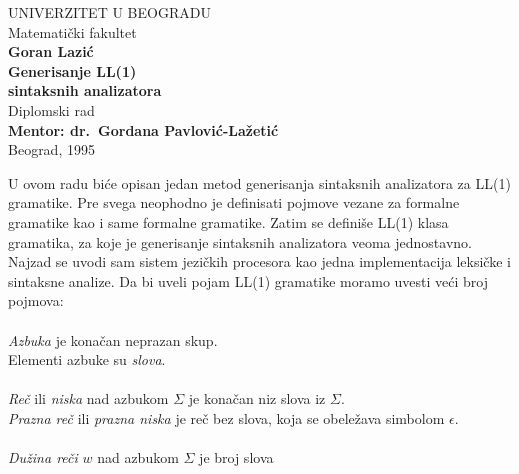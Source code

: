 %
%
  \begin{titlepage}
    \vspace{10em}
    \begin{center}
      {\Large UNIVERZITET U BEOGRADU}\\
      \vspace{1cm}
      {\Large Matemati\v cki fakultet}\\
      \vspace{4.5cm}
      {\Large{\bf Goran Lazi\'c}}\\
      \vspace{1cm}
      {\LARGE{\bf Generisanje LL(1)}}\\
      {\LARGE{\bf sintaksnih analizatora}}\\
      \vspace{0.7cm}
      {\Large Diplomski rad}\\
      \vspace{2cm}
      {\Large{\bf Mentor: dr.\ Gordana Pavlovi\'c-La\v zeti\'c}}\\
      \vspace{6.5cm}
      {\large Beograd, 1995}
    \end{center}
  \end{titlepage}
%
%
  \tableofcontents
%
%
  \noindent
    U ovom radu bi\'ce opisan jedan metod generisanja sintaksnih analizatora
    za LL(1) gramatike.
    Pre svega neophodno je definisati pojmove vezane za formalne gramatike
    kao i same formalne gramatike.
    Zatim se defini\v se LL(1) klasa gramatika, za koje je generisanje
    sintaksnih analizatora veoma jednostavno.
    Najzad se uvodi sam sistem jezi\v ckih procesora kao jedna
    implementacija leksi\v cke i sintaksne analize.
%
%
      Da bi uveli pojam LL(1) gramatike moramo uvesti ve\'ci broj pojmova:\\
      \\
      {\em Azbuka} je kona\v can neprazan skup.\\
      Elementi azbuke su {\em slova}.\\
      \\
      {\em Re\v c} ili {\em niska} nad azbukom $\Sigma$ je kona\v can niz
      slova iz $\Sigma$.\\
      {\em Prazna re\v c} ili {\em prazna niska} je re\v c bez slova, koja
      se obele\v zava simbolom $\epsilon$.\\
      \\
      {\em Du\v zina re\v ci} $w$ nad azbukom $\Sigma$ je broj slova
